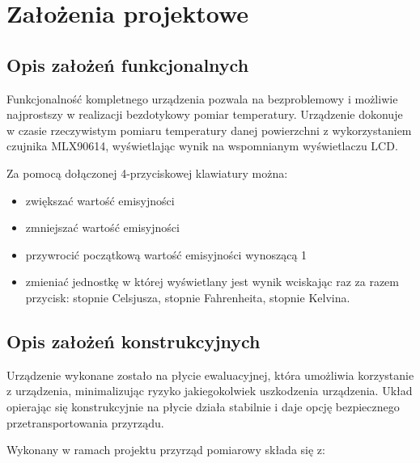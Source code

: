 \chapter{Założenia projektowe}

    \section{Opis założeń funkcjonalnych}

    Funkcjonalność kompletnego urządzenia pozwala na bezproblemowy i możliwie najprostszy w realizacji bezdotykowy pomiar temperatury. Urządzenie dokonuje w czasie rzeczywistym pomiaru temperatury danej powierzchni z wykorzystaniem czujnika MLX90614, wyświetlając wynik na wspomnianym wyświetlaczu LCD. 
    
    \vspace{12pt}

    Za pomocą dołączonej 4-przyciskowej klawiatury można:

    \begin{itemize}

        \item zwiększać wartość emisyjności
        \item zmniejszać wartość emisyjności
        \item przywrocić początkową wartość emisyjności wynoszącą 1
        \item zmieniać jednostkę w której wyświetlany jest wynik wciskając raz za razem przycisk: stopnie Celsjusza, stopnie Fahrenheita, stopnie Kelvina.

    \end{itemize}

    \section{Opis założeń konstrukcyjnych}
    
    Urządzenie wykonane zostało na płycie ewaluacyjnej, która umożliwia korzystanie z urządzenia, minimalizując ryzyko jakiegokolwiek uszkodzenia urządzenia. Układ opierając się konstrukcyjnie na płycie działa stabilnie i daje opcję bezpiecznego przetransportowania przyrządu.

    \vspace{12pt}

    Wykonany w ramach projektu przyrząd pomiarowy składa się z:

